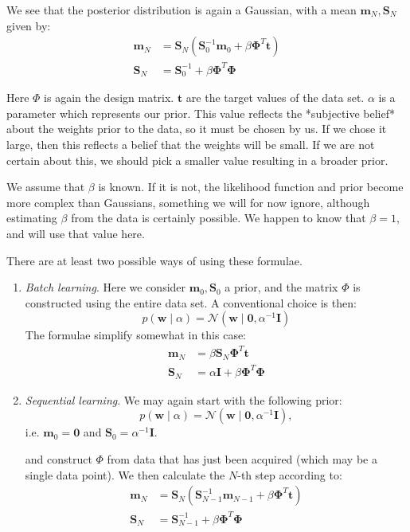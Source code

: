 We see that the posterior distribution is again a Gaussian, with a mean $\boldsymbol{m}_N, \boldsymbol{S}_N$ given by:
\begin{align}
\boldsymbol{m}_N & =  \boldsymbol{S}_{N}(\boldsymbol{S}^{-1}_0 \boldsymbol{m}_0 +\beta \boldsymbol{\Phi}^T \boldsymbol{t}) \\
\boldsymbol{S}_N & =  \boldsymbol{S}^{-1}_0 + \beta \boldsymbol{\Phi}^T \boldsymbol{\Phi}
\end{align}

Here $\Phi$ is again the design matrix. $\boldsymbol{t}$ are the target values of the data set. $\alpha$ is
a parameter which represents our prior. This value reflects the *subjective belief* about the weights prior to the data, so it must be chosen by us. If we chose it large, then this reflects a belief that the weights will be small. If we are not certain about this, we should pick a smaller value resulting in a broader prior. 

We assume that $\beta$ is known. If it is not, the likelihood function and prior become more complex than Gaussians, something we will for now ignore,
although estimating $\beta$ from the data is certainly possible. We happen to know that $\beta = 1$, and will use that  value here.




There are at least two possible ways of using these formulae.
\begin{enumerate}
\item  \emph{Batch learning}. Here we consider $\boldsymbol{m}_0, \boldsymbol{S}_0$ a prior, and the matrix $\Phi$ is constructed using the entire data set. A conventional choice is then:
$$
p(\boldsymbol{w} \mid \alpha) = \mathcal{N}(\boldsymbol{w} \mid \boldsymbol{0}, \alpha^{-1} \boldsymbol{I})
$$
The formulae simplify somewhat in this case:
\begin{align}
\boldsymbol{m}_N & =  \beta \boldsymbol{S}_{N} \boldsymbol{\Phi}^T \boldsymbol{t} \\
\boldsymbol{S}_N & =  \alpha\boldsymbol{I} + \beta \boldsymbol{\Phi}^T \boldsymbol{\Phi}
\end{align}




\item  \emph{Sequential learning}. We may again start with the following prior:
$$
p(\boldsymbol{w} \mid \alpha) = \mathcal{N}(\boldsymbol{w} \mid \boldsymbol{0}, \alpha^{-1} \boldsymbol{I}),
$$
i.e. $\boldsymbol{m}_0 = \boldsymbol{0}$ and $\boldsymbol{S}_0 = \alpha^{-1} \boldsymbol{I}$.

and construct $\Phi$ from data that has just been acquired (which may be a single data point). We then
calculate the $N$-th step according to:
\begin{align}
\boldsymbol{m}_N & =  \boldsymbol{S}_{N}(\boldsymbol{S}^{-1}_{N-1} \boldsymbol{m}_{N-1} +\beta \boldsymbol{\Phi}^T \boldsymbol{t}) \\
\boldsymbol{S}_N & =  \boldsymbol{S}^{-1}_{N-1} + \beta \boldsymbol{\Phi}^T \boldsymbol{\Phi}
\end{align}

\end{enumerate}






